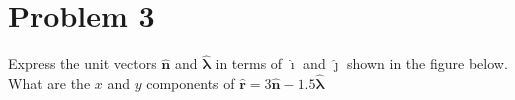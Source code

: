 \section*{Problem 3}

Express the unit vectors \( \mathbf{\hat{n}} \) and \( \mathbf{\hat{\lambda}} \) in terms of \( \mathbf{\hat{\imath}} \) and \( \mathbf{\hat{\jmath}} \) shown in the figure below.
What are the \( x \) and \( y \) components of \( \mathbf{\hat{r}} = 3\mathbf{\hat{n}} - 1.5\mathbf{\hat{\lambda}} \)
